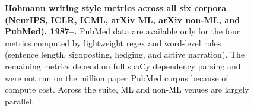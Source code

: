 \begin{figure}[htbp]
\vspace{2mm}

\caption{\textbf{Hohmann writing style metrics across all six
  corpora (NeurIPS, ICLR, ICML, arXiv ML, arXiv non-ML, and
  PubMed), 1987--.}
  PubMed data are available only for the four metrics computed
  by lightweight regex and word-level rules (sentence length,
  signposting, hedging, and active narration). The remaining
  metrics depend on full spaCy dependency parsing and were not
  run on the  million paper PubMed corpus because of compute
  cost.  Across the suite, ML and non-ML venues are
  largely parallel.}
\label{fig:app-hohmann}
\end{figure}
